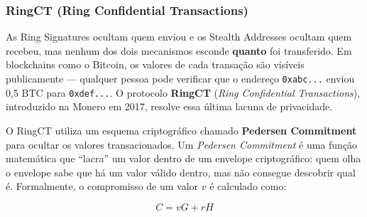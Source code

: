 \begin{figure}[htb]
\end{figure}

\subsubsection{RingCT (Ring Confidential Transactions)}

As Ring Signatures ocultam quem enviou e os Stealth Addresses ocultam quem recebeu, mas nenhum dos dois mecanismos esconde \textbf{quanto} foi transferido. Em blockchains como o Bitcoin, os valores de cada transação são visíveis publicamente --- qualquer pessoa pode verificar que o endereço \texttt{0xabc...} enviou 0,5 BTC para \texttt{0xdef...}. O protocolo \textbf{RingCT} (\textit{Ring Confidential Transactions}), introduzido na Monero em 2017, resolve essa última lacuna de privacidade.

O RingCT utiliza um esquema criptográfico chamado \textbf{Pedersen Commitment} para ocultar os valores transacionados. Um \textit{Pedersen Commitment} é uma função matemática que ``lacra'' um valor dentro de um envelope criptográfico: quem olha o envelope sabe que há um valor válido dentro, mas não consegue descobrir qual é. Formalmente, o compromisso de um valor $v$ é calculado como:

\begin{equation}
\label{eq:pedersen}
C = vG + rH
\end{equation}

